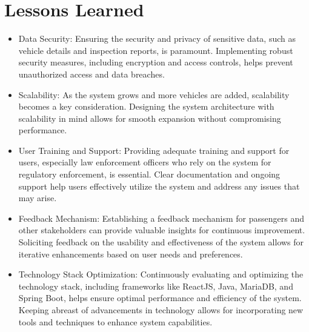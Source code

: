 \documentclass[a4paper, 12pt]{report}
\begin{document}
\section{Lessons Learned}
\begin{itemize}
    \item Data Security: Ensuring the security and privacy of sensitive data, such as vehicle details and inspection reports, is paramount. Implementing robust security measures, including encryption and access controls, helps prevent unauthorized access and data breaches.
    \item Scalability: As the system grows and more vehicles are added, scalability becomes a key consideration. Designing the system architecture with scalability in mind allows for smooth expansion without compromising performance.
    \item User Training and Support: Providing adequate training and support for users, especially law enforcement officers who rely on the system for regulatory enforcement, is essential. Clear documentation and ongoing support help users effectively utilize the system and address any issues that may arise.
    \item Feedback Mechanism: Establishing a feedback mechanism for passengers and other stakeholders can provide valuable insights for continuous improvement. Soliciting feedback on the usability and effectiveness of the system allows for iterative enhancements based on user needs and preferences.
    \item Technology Stack Optimization: Continuously evaluating and optimizing the technology stack, including frameworks like ReactJS, Java, MariaDB, and Spring Boot, helps ensure optimal performance and efficiency of the system. Keeping abreast of advancements in technology allows for incorporating new tools and techniques to enhance system capabilities.
\end{itemize}
\end{document}
